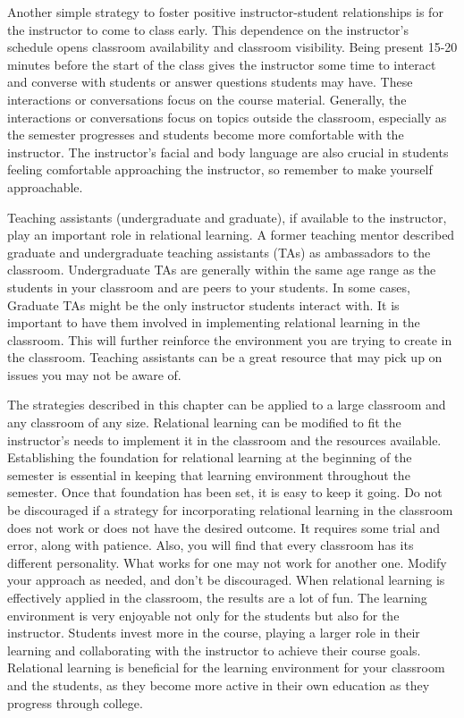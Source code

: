 \documentclass{book}
\begin{document}
Another simple strategy to foster positive instructor-student relationships is
for the instructor to come to class early. This dependence on the instructor's
schedule opens classroom availability and classroom visibility. Being present
15-20 minutes before the start of the class gives the instructor some time to
interact and converse with students or answer questions students may have.
These interactions or conversations focus on the course material. Generally,
the interactions or conversations focus on topics outside the classroom,
especially as the semester progresses and students become more comfortable
with the instructor. The instructor's facial and body language are also
crucial in students feeling comfortable approaching the instructor, so
remember to make yourself approachable.~ ~

Teaching assistants (undergraduate and graduate), if available to the
instructor, play an important role in relational learning. A former teaching
mentor described graduate and undergraduate teaching assistants (TAs) as
ambassadors to the classroom. Undergraduate TAs are generally within the same
age range as the students in your classroom and are peers to your students. In
some cases, Graduate TAs might be the only instructor students interact with.
It is important to have them involved in implementing relational learning in
the classroom. This will further reinforce the environment you are trying to
create in the classroom. Teaching assistants can be a great resource that may
pick up on issues you may not be aware of.~

The strategies described in this chapter can be applied to a large classroom
and any classroom of any size. Relational learning can be modified to fit the
instructor's needs to implement it in the classroom and the resources
available. Establishing the foundation for relational learning at the
beginning of the semester is essential in keeping that learning environment
throughout the semester. Once that foundation has been set, it is easy to keep
it going. Do not be discouraged if a strategy for incorporating relational
learning in the classroom does not work or does not have the desired outcome.
It requires some trial and error, along with patience. Also, you will find
that every classroom has its different personality. What works for one may not
work for another one. Modify your approach as needed, and don't be
discouraged. When relational learning is effectively applied in the classroom,
the results are a lot of fun. The learning environment is very enjoyable not
only for the students but also for the instructor. Students invest more in the
course, playing a larger role in their learning and collaborating with the
instructor to achieve their course goals. Relational learning is beneficial
for the learning environment for your classroom and the students, as they
become more active in their own education as they progress through college.~
\end{document}
